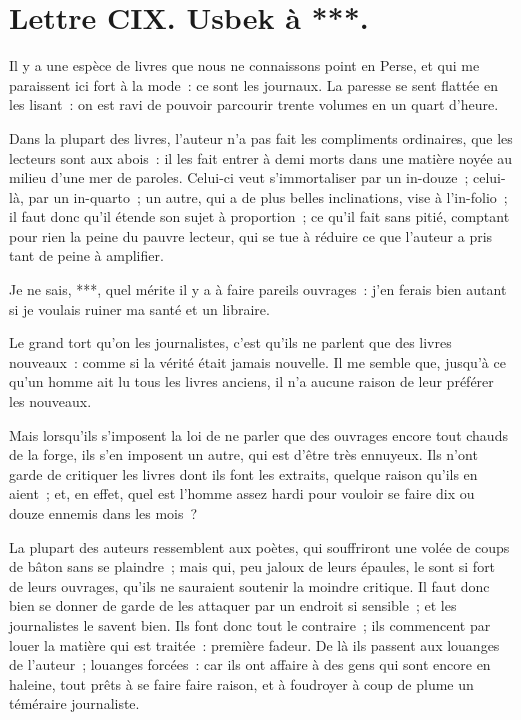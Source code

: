 \documentclass[french,twoside]{book} %
\newcommand{\dateline}[1]{\medskip{\RaggedLeft{#1}\par}\bigskip}
\begin{document}
\dateline{De Paris, le dernier de la lune de Chalval, 1717.}
\section[{Lettre CIX. Usbek à ***.}]{Lettre CIX. Usbek à ***.}\renewcommand{\leftmark}{Lettre CIX. Usbek à ***.}

\noindent Il y a une espèce de livres que nous ne connaissons point en Perse, et qui me paraissent ici fort à la mode : ce sont les journaux. La paresse se sent flattée en les lisant : on est ravi de pouvoir parcourir trente volumes en un quart d’heure.\par
Dans la plupart des livres, l’auteur n’a pas fait les compliments ordinaires, que les lecteurs sont aux abois : il les fait entrer à demi morts dans une matière noyée au milieu d’une mer de paroles. Celui-ci veut s’immortaliser par un in-douze ; celui-là, par un in-quarto ; un autre, qui a de plus belles inclinations, vise à l’in-folio ; il faut donc qu’il étende son sujet à proportion ; ce qu’il fait sans pitié, comptant pour rien la peine du pauvre lecteur, qui se tue à réduire ce que l’auteur a pris tant de peine à amplifier.\par
Je ne sais, ***, quel mérite il y a à faire pareils ouvrages : j’en ferais bien autant si je voulais ruiner ma santé et un libraire.\par
Le grand tort qu’on les journalistes, c’est qu’ils ne parlent que des livres nouveaux : comme si la vérité était jamais nouvelle. Il me semble que, jusqu’à ce qu’un homme ait lu tous les livres anciens, il n’a aucune raison de leur préférer les nouveaux.\par
Mais lorsqu’ils s’imposent la loi de ne parler que des ouvrages encore tout chauds de la forge, ils s’en imposent un autre, qui est d’être très ennuyeux. Ils n’ont garde de critiquer les livres dont ils font les extraits, quelque raison qu’ils en aient ; et, en effet, quel est l’homme assez hardi pour vouloir se faire dix ou douze ennemis dans les mois ?\par
La plupart des auteurs ressemblent aux poètes, qui souffriront une volée de coups de bâton sans se plaindre ; mais qui, peu jaloux de leurs épaules, le sont si fort de leurs ouvrages, qu’ils ne sauraient soutenir la moindre critique. Il faut donc bien se donner de garde de les attaquer par un endroit si sensible ; et les journalistes le savent bien. Ils font donc tout le contraire ; ils commencent par louer la matière qui est traitée : première fadeur. De là ils passent aux louanges de l’auteur ; louanges forcées : car ils ont affaire à des gens qui sont encore en haleine, tout prêts à se faire faire raison, et à foudroyer à coup de plume un téméraire journaliste.\par
\end{document}
